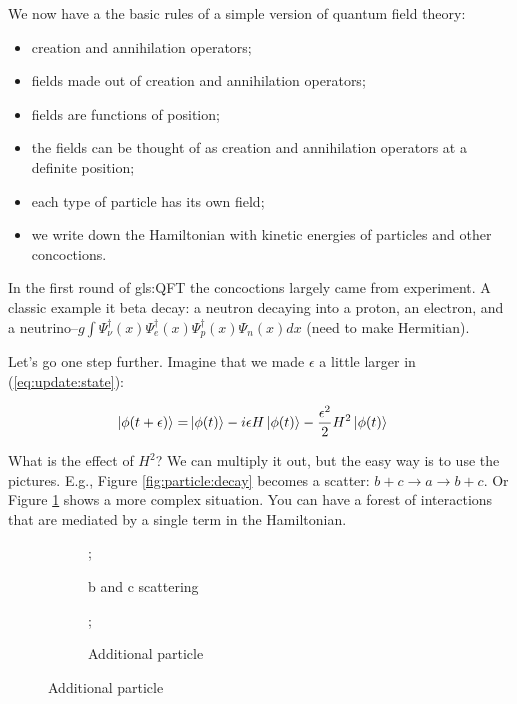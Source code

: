 \documentclass[]{article}
\begin{document}
We now have a the basic rules of a simple version of quantum field theory:
\begin{itemize}
	\item creation and annihilation operators;
	\item fields made out of creation and annihilation operators;
	\item fields are functions of position;
	\item the fields can be thought of as creation and annihilation operators at a definite position;
	\item each type of particle has its own field;
	\item we write down the Hamiltonian with kinetic energies of particles and other concoctions. 
\end{itemize}

In the first round of \gls{gls:QFT} the concoctions largely came from experiment. A classic example it beta decay: a neutron decaying into a proton, an electron, and a neutrino--$g \int \Psi^\dagger_{\nu}(x) \Psi^\dagger_e(x) \Psi^\dagger_p(x) \Psi_n(x) dx$ (need to make Hermitian).

Let's go one step further. Imagine that we made $\epsilon$ a little larger in (\ref{eq:update:state}):

\begin{align*}
	\ket{\phi(t+\epsilon)} =& \ket{\phi(t)} -i \epsilon H \ket{\phi(t)} - \frac{\epsilon^2}{2} H^2 \ket{\phi(t)}
\end{align*}

What is the effect of $H^2$? We can multiply it out, but the easy way is to use the pictures. E.g., Figure \ref{fig:particle:decay} becomes a scatter: $b+c \rightarrow a \rightarrow b + c$. Or Figure \ref{fig:scatter:annihilate} shows a more complex situation. You can have a forest of interactions that are mediated by a single term in the Hamiltonian. 

\begin{figure}[H]
	\caption{$\Psi^\dagger_c\Psi^\dagger_b\Psi_a\Psi^\dagger_a\Psi_b\Psi_c$}
	\begin{subfigure}[t]{0.45\textwidth}
		\caption{b and c scattering}\label{fig:scatter:annihilate}
		;
	\end{subfigure}
	\begin{subfigure}[t]{0.45\textwidth}
		\caption{Additional particle}\label{fig:additional:particle}
		;
	\end{subfigure}
\end{figure}
\end{document}
